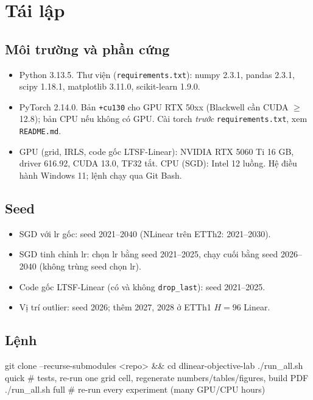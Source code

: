 \section{Tái lập}
\label{app:repro}

\subsection{Môi trường và phần cứng}

\begin{itemize}
    \item Python 3.13.5. Thư viện (\texttt{requirements.txt}): numpy 2.3.1, pandas 2.3.1, scipy 1.18.1, matplotlib 3.11.0, scikit-learn 1.9.0.
    \item PyTorch 2.14.0. Bản \texttt{+cu130} cho GPU RTX 50xx (Blackwell cần CUDA $\ge$ 12.8); bản CPU nếu không có GPU. Cài torch \emph{trước} \texttt{requirements.txt}, xem \texttt{README.md}.
    \item GPU (grid, IRLS, code gốc LTSF-Linear): NVIDIA RTX 5060 Ti 16 GB, driver 616.92, CUDA 13.0, TF32 tắt. CPU (SGD): Intel 12 luồng. Hệ điều hành Windows 11; lệnh chạy qua Git Bash.
\end{itemize}

\subsection{Seed}

\begin{itemize}
    \item SGD với lr gốc: seed 2021--2040 (NLinear trên ETTh2: 2021--2030).
    \item SGD tinh chỉnh lr: chọn lr bằng seed 2021--2025, chạy cuối bằng seed 2026--2040 (không trùng seed chọn lr).
    \item Code gốc LTSF-Linear (có và không \texttt{drop\_last}): seed 2021--2025.
    \item Vị trí outlier: seed 2026; thêm 2027, 2028 ở ETTh1 $H = 96$ Linear.
\end{itemize}

\subsection{Lệnh}

\begin{aivncodebox}
\begin{python}
git clone --recurse-submodules <repo> && cd dlinear-objective-lab
./run_all.sh quick   # tests, re-run one grid cell, regenerate numbers/tables/figures, build PDF
./run_all.sh full    # re-run every experiment (many GPU/CPU hours)
\end{python}
\end{aivncodebox}

